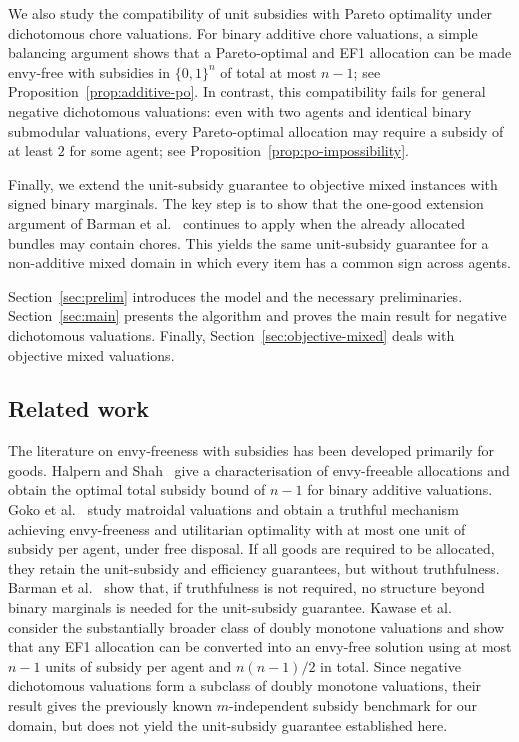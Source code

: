 \documentclass[sigconf,anonymous]{aamas}
\theoremstyle{acmplain}
\theoremstyle{acmdefinition}
\theoremstyle{acmplain}
\begin{document}
We also study the compatibility of unit subsidies with Pareto optimality under dichotomous chore valuations. For binary additive chore valuations, a simple balancing argument shows that a Pareto-optimal and EF1 allocation can be made envy-free with subsidies in \(\{0,1\}^n\) of total at most \(n-1\); see Proposition~\ref{prop:additive-po}. In contrast, this compatibility fails for general negative dichotomous valuations: even with two agents and identical binary submodular valuations, every Pareto-optimal allocation may require a subsidy of at least \(2\) for some agent; see Proposition~\ref{prop:po-impossibility}.


Finally, we extend the unit-subsidy guarantee to objective mixed instances with signed binary marginals. The key step is to show that the one-good extension argument of Barman et al.~\cite{BKNS22} continues to apply when the already allocated bundles may contain chores. This yields the same unit-subsidy guarantee for a non-additive mixed domain in which every item has a common sign across agents.

Section~\ref{sec:prelim} introduces the model and the necessary preliminaries. Section~\ref{sec:main} presents the algorithm and proves the main result for negative dichotomous valuations. Finally, Section~\ref{sec:objective-mixed} deals with objective mixed valuations.


\subsection{Related work}

The literature on envy-freeness with subsidies has been developed primarily for goods. Halpern and Shah~\cite{HS19} give a characterisation of envy-freeable allocations and obtain the optimal total subsidy bound of $n-1$ for binary additive valuations. Goko et al.~\cite{goko2024fair} study matroidal valuations and obtain a truthful mechanism achieving envy-freeness and utilitarian optimality with at most one unit of subsidy per agent, under free disposal. If all goods are required to be allocated, they retain the unit-subsidy and efficiency guarantees, but without truthfulness. Barman et al.~\cite{BKNS22} show that, if truthfulness is not required, no structure beyond binary marginals is needed for the unit-subsidy guarantee. Kawase et al.~\cite{kawase2025towards} consider the substantially broader class of doubly monotone valuations and show that any EF1 allocation can be converted into an envy-free solution using at most $n-1$ units of subsidy per agent and $n(n-1)/2$ in total. Since negative dichotomous valuations form a subclass of doubly monotone valuations, their result gives the previously known $m$-independent subsidy benchmark for our domain, but does not yield the unit-subsidy guarantee established here.
\end{document}
